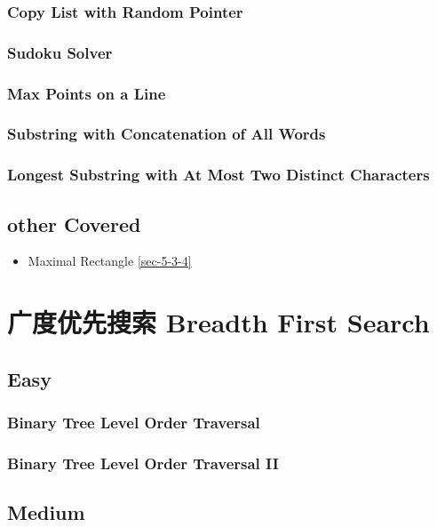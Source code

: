 \documentclass[12pt]{book}
\begin{document}
\subsection{Copy List with Random Pointer}
\label{sec-6-3-2}
\subsection{Sudoku Solver}
\label{sec-6-3-3}
\subsection{Max Points on a Line}
\label{sec-6-3-4}
\subsection{Substring with Concatenation of All Words}
\label{sec-6-3-5}
\subsection{Longest Substring with At Most Two Distinct Characters}
\label{sec-6-3-6}
\section{other Covered}
\label{sec-6-4}
\begin{itemize}
\item Maximal Rectangle
\ref{sec-5-3-4}
\end{itemize}

\chapter{广度优先搜索 Breadth First Search}
\label{sec-7}
\section{Easy}
\label{sec-7-1}
\subsection{Binary Tree Level Order Traversal}
\label{sec-7-1-1}
\subsection{Binary Tree Level Order Traversal II}
\label{sec-7-1-2}
\section{Medium}
\label{sec-7-2}
\end{document}
